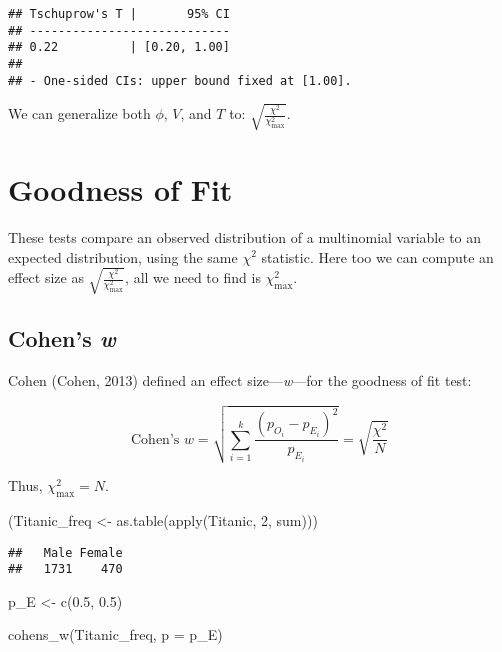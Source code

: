 \documentclass[
]{article}
\newenvironment{Shaded}{\begin{snugshade}}{\end{snugshade}}
\newcommand{\AttributeTok}[1]{\textcolor[rgb]{0.77,0.63,0.00}{#1}}
\newcommand{\DecValTok}[1]{\textcolor[rgb]{0.00,0.00,0.81}{#1}}
\newcommand{\FloatTok}[1]{\textcolor[rgb]{0.00,0.00,0.81}{#1}}
\newcommand{\FunctionTok}[1]{\textcolor[rgb]{0.00,0.00,0.00}{#1}}
\newcommand{\NormalTok}[1]{#1}
\newcommand{\OtherTok}[1]{\textcolor[rgb]{0.56,0.35,0.01}{#1}}
\begin{document}
\begin{verbatim}
## Tschuprow's T |       95% CI
## ----------------------------
## 0.22          | [0.20, 1.00]
## 
## - One-sided CIs: upper bound fixed at [1.00].
\end{verbatim}

We can generalize both \(\phi\), \(V\), and \(T\) to:
\(\sqrt{\frac{\chi^2}{\chi^2_{\text{max}}}}\).

\hypertarget{goodness-of-fit}{%
\section{Goodness of Fit}\label{goodness-of-fit}}

These tests compare an observed distribution of a multinomial variable
to an expected distribution, using the same \(\chi^2\) statistic. Here
too we can compute an effect size as
\(\sqrt{\frac{\chi^2}{\chi^2_{\text{max}}}}\), all we need to find is
\(\chi^2_{\text{max}}\).

\hypertarget{cohens-w}{%
\subsection{\texorpdfstring{Cohen's
\emph{w}}{Cohen's w}}\label{cohens-w}}

Cohen (Cohen, 2013) defined an effect size---\emph{w}---for the goodness
of fit test:

\[
\text{Cohen's } w = \sqrt{\sum_{i=1}^{k}{\frac{(p_{O_i}-p_{E_i})^2}{p_{E_i}}}} = \sqrt{\frac{\chi^2}{N}}
\]

Thus, \(\chi^2_\text{max} = N\).

\begin{Shaded}
\begin{Highlighting}[]
\NormalTok{(Titanic\_freq }\OtherTok{\textless{}{-}} \FunctionTok{as.table}\NormalTok{(}\FunctionTok{apply}\NormalTok{(Titanic, }\DecValTok{2}\NormalTok{, sum)))}
\end{Highlighting}
\end{Shaded}

\begin{verbatim}
##   Male Female 
##   1731    470
\end{verbatim}

\begin{Shaded}
\begin{Highlighting}[]
\NormalTok{p\_E }\OtherTok{\textless{}{-}} \FunctionTok{c}\NormalTok{(}\FloatTok{0.5}\NormalTok{, }\FloatTok{0.5}\NormalTok{)}

\FunctionTok{cohens\_w}\NormalTok{(Titanic\_freq, }\AttributeTok{p =}\NormalTok{ p\_E)}
\end{Highlighting}
\end{Shaded}
\end{document}
